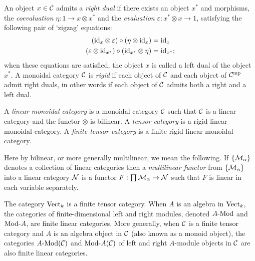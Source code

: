 \documentclass{amsart}
\begin{document}
\begin{definition} \label{def:rigid}
	An object $x \in \mathcal C$ admits a {\em right dual} if there exists an object $x^*$ and morphisms, the {\em coevaluation} $\eta: 1 \to x \otimes x^*$ and the {\em evaluation} $\varepsilon: x^* \otimes x \to 1$, satisfying the following pair of `zigzag' equations:
	\begin{align*}
		(\mathrm{id}_{x} \otimes \varepsilon  ) \circ (  \eta \otimes \mathrm{id}_{x}) &= \mathrm{id}_{x} \\
		(\varepsilon \otimes \mathrm{id}_{x^*}) \circ (\mathrm{id}_{x^*} \otimes \eta) &= \mathrm{id}_{x^*};
	\end{align*}
	when these equations are satisfied, the object $x$ is called a left dual of the object $x^*$.  A monoidal category $\mathcal C$ is {\em rigid} if each object of $\mathcal C$ and each object of $\mathcal C^{\mathrm{mp}}$ admit right duals, in other words if each object of $\mathcal C$ admits both a right and a left dual. 
\end{definition}



\begin{definition}
	A {\em linear monoidal category} is a monoidal category $\mathcal C$ such that $\mathcal C$ is a linear category and the functor $\otimes$ is bilinear.  A {\em tensor category} is a rigid linear monoidal category.  A {\em finite tensor category} is a finite rigid linear monoidal category.   
\end{definition}

\nid Here by bilinear, or more generally multilinear, we mean the following.  If $\{\mathcal M_\alpha\}$ denotes a collection of linear categories then a {\em multilinear functor} from $\{\mathcal M_\alpha\}$ into a linear category $\mathcal N$ is a functor $F: \prod \mathcal M_\alpha \to \mathcal N$ such that $F$ is linear in each variable separately. 



\begin{example}
	The category $\mathrm{Vect}_k$ is a finite tensor category. When $A$ is an algebra in $\mathrm{Vect}_k$, the categories of finite-dimensional left and right modules, denoted $\Mod{A}{}$ and $\Mod{}{A}$, are finite linear categories. More generally, when $\mathcal C$ is a finite tensor category and $A$ is an algebra object in $\mathcal C$ (also known as a monoid object), the categories $\Mod{A}{}(\cC)$ and $\Mod{}{A}(\cC)$ of left and right $A$-module objects in $\mathcal C$ are also finite linear categories.
\end{example}
\end{document}
